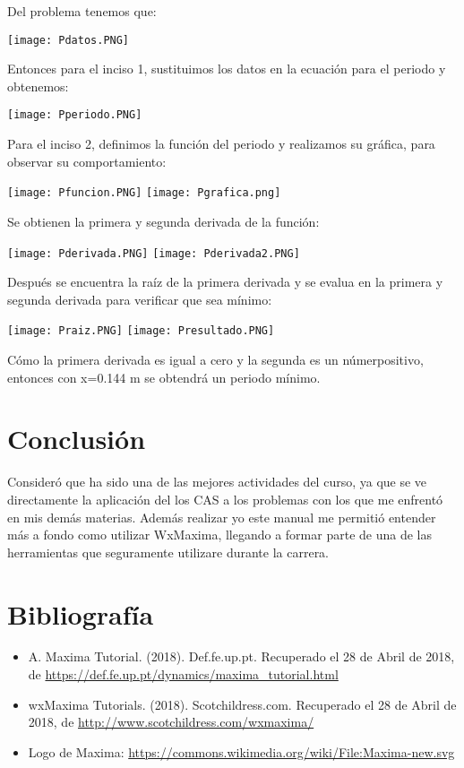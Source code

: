 \documentclass{article}
\begin{document}
Del problema tenemos que:

\begin{center}
\texttt{[image: Pdatos.PNG]}
\end{center}

Entonces para el inciso 1, sustituimos los datos en la ecuación para el periodo y obtenemos:
\begin{center}
\texttt{[image: Pperiodo.PNG]}
\end{center}

Para el inciso 2, definimos la función del periodo y realizamos su gráfica, para observar su comportamiento:

\begin{center}
\texttt{[image: Pfuncion.PNG]}
\texttt{[image: Pgrafica.png]}
\end{center}

Se obtienen la primera y segunda derivada de la función:
\begin{center}
\texttt{[image: Pderivada.PNG]}
\texttt{[image: Pderivada2.PNG]}
\end{center}

Después se encuentra la raíz de la primera derivada y se evalua en la primera y segunda derivada para verificar que sea mínimo:
\begin{center}
\texttt{[image: Praiz.PNG]}
\texttt{[image: Presultado.PNG]}
\end{center}
Cómo la primera derivada es igual a cero y la segunda es un númerpositivo, entonces con x=0.144 m se obtendrá un periodo mínimo.
\section{Conclusión}
Consideró que ha sido una de las mejores actividades del curso, ya que se ve directamente la aplicación del los CAS a los problemas con los que me enfrentó en mis demás materias. Además realizar yo este manual me permitió entender más a fondo como utilizar WxMaxima, llegando a formar parte de una de las herramientas que seguramente utilizare durante la carrera.

\section{Bibliografía}
\begin{itemize}
\item A. Maxima Tutorial. (2018). Def.fe.up.pt. Recuperado el 28 de Abril de 2018, de \url{https://def.fe.up.pt/dynamics/maxima_tutorial.html}
\item wxMaxima Tutorials. (2018). Scotchildress.com. Recuperado el 28 de Abril de 2018, de \url{http://www.scotchildress.com/wxmaxima/}
\item Logo de Maxima: \url{https://commons.wikimedia.org/wiki/File:Maxima-new.svg}
\end{itemize}
\end{document}
